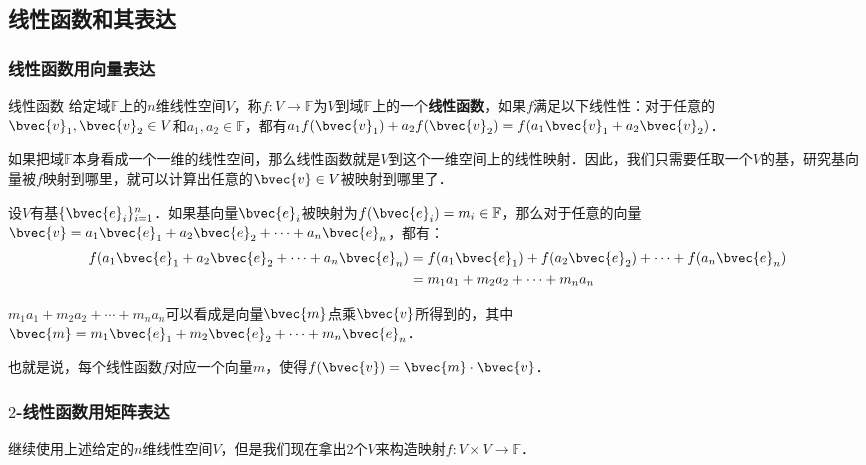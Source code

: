 

\subsection{线性函数和其表达}
\subsubsection{线性函数用向量表达}
\begin{definition}{线性函数}
给定域$\mathbb{F}$上的$n$维线性空间$V$，称$f:V\rightarrow \mathbb{F}$为$V$到域$\mathbb{F}$上的一个\textbf{线性函数}，如果$f$满足以下线性性：对于任意的$\bvec{v}_1, \bvec{v}_2\in V$和$a_1, a_2\in\mathbb{F}$，都有$a_1f(\bvec{v}_1)+a_2f(\bvec{v}_2)=f(a_1\bvec{v}_1+a_2\bvec{v}_2)$．
\end{definition}

如果把域$\mathbb{F}$本身看成一个一维的线性空间，那么线性函数就是$V$到这个一维空间上的线性映射．因此，我们只需要任取一个$V$的基，研究基向量被$f$映射到哪里，就可以计算出任意的$\bvec{v}\in V$被映射到哪里了．

设$V$有基$\{\bvec{e}_i\}_{i=1}^n$．如果基向量$\bvec{e}_i$被映射为$f(\bvec{e}_i)=m_i\in\mathbb{F}$，那么对于任意的向量$\bvec{v}=a_1\bvec{e}_1+a_2\bvec{e}_2+\cdots+a_n\bvec{e}_n$，都有：
\begin{equation}
\begin{aligned}
f(a_1\bvec{e}_1+a_2\bvec{e}_2+\cdots+a_n\bvec{e}_n)&=f(a_1\bvec{e}_1)+f(a_2\bvec{e}_2)+\cdots+f(a_n\bvec{e}_n)\\&=m_1a_1+m_2a_2+\cdots+m_na_n
\end{aligned}
\end{equation}

$m_1a_1+m_2a_2+\cdots+m_na_n$可以看成是向量$\bvec{m}$点乘$\bvec{v}$所得到的，其中$\bvec{m}=m_1\bvec{e}_1+m_2\bvec{e}_2+\cdots+m_n\bvec{e}_n$．

也就是说，每个线性函数$f$对应一个向量$m$，使得$f(\bvec{v})=\bvec{m}\cdot\bvec{v}$．

\subsubsection{$2$-线性函数用矩阵表达}

继续使用上述给定的$n$维线性空间$V$，但是我们现在拿出$2$个$V$来构造映射$f:V\times V\rightarrow\mathbb{F}$．

